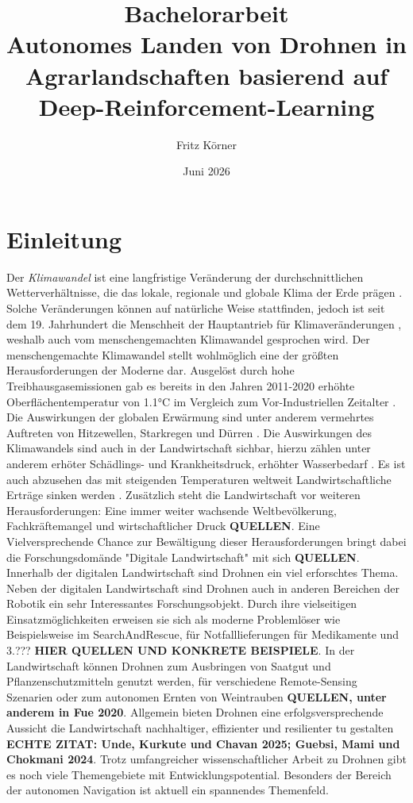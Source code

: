 \documentclass[12pt]{article}
\title{Bachelorarbeit \\ Autonomes Landen von Drohnen in Agrarlandschaften basierend auf Deep-Reinforcement-Learning}
\author{Fritz Körner}
\date{Juni 2026}
\begin{document}
\maketitle

\section{Einleitung}
Der \textit{Klimawandel} ist eine langfristige Veränderung der durchschnittlichen Wetterverhältnisse, die das lokale, regionale und globale Klima der Erde prägen \autocite{WhatClimateChange2022}. Solche Veränderungen können auf natürliche Weise stattfinden, jedoch ist seit dem 19. Jahrhundert die Menschheit der Hauptantrieb für Klimaveränderungen \autocite{nationsWhatClimateChange}, weshalb auch vom menschengemachten Klimawandel gesprochen wird. Der menschengemachte Klimawandel stellt wohlmöglich eine der größten Herausforderungen der Moderne dar. Ausgelöst durch hohe Treibhausgasemissionen gab es bereits in den Jahren 2011-2020 erhöhte Oberflächentemperatur von 1.1°C im Vergleich zum Vor-Industriellen Zeitalter \autocite{calvinIPCC2023Climate2023}. Die Auswirkungen der globalen Erwärmung sind unter anderem vermehrtes Auftreten von Hitzewellen, Starkregen und Dürren \autocite{calvinIPCC2023Climate2023}. Die Auswirkungen des Klimawandels sind auch in der Landwirtschaft sichbar, hierzu zählen unter anderem erhöter Schädlings- und Krankheitsdruck, erhöhter Wasserbedarf \autocite{ClimateChangeTrends}. Es ist auch abzusehen das mit steigenden Temperaturen weltweit Landwirtschaftliche Erträge sinken werden \autocite{hultgrenImpactsClimateChange2025}. Zusätzlich steht die Landwirtschaft vor weiteren Herausforderungen: Eine immer weiter wachsende Weltbevölkerung, Fachkräftemangel und wirtschaftlicher Druck \textbf{QUELLEN}.
Eine Vielversprechende Chance zur Bewältigung dieser Herausforderungen bringt dabei die Forschungsdomände "Digitale Landwirtschaft" mit sich \textbf{QUELLEN}. Innerhalb der digitalen Landwirtschaft sind Drohnen ein viel erforschtes Thema. Neben der digitalen Landwirtschaft sind Drohnen auch in anderen Bereichen der Robotik ein sehr Interessantes Forschungsobjekt. Durch ihre vielseitigen Einsatzmöglichkeiten erweisen sie sich als moderne Problemlöser wie Beispielsweise im SearchAndRescue, für Notfalllieferungen für Medikamente und 3.??? \textbf{HIER QUELLEN UND KONKRETE BEISPIELE}. In der Landwirtschaft können Drohnen zum Ausbringen von Saatgut und Pflanzenschutzmitteln genutzt werden, für verschiedene Remote-Sensing Szenarien oder zum autonomen Ernten von Weintrauben \textbf{QUELLEN, unter anderem in Fue 2020}. Allgemein bieten Drohnen eine erfolgsversprechende Aussicht die Landwirtschaft nachhaltiger, effizienter und resilienter tu gestalten \textbf{ECHTE ZITAT: Unde, Kurkute und Chavan 2025; Guebsi, Mami und Chokmani 2024}. Trotz umfangreicher wissenschaftlicher Arbeit zu Drohnen gibt es noch viele Themengebiete mit Entwicklungspotential. Besonders der Bereich der autonomen Navigation ist aktuell ein spannendes Themenfeld.
\end{document}
